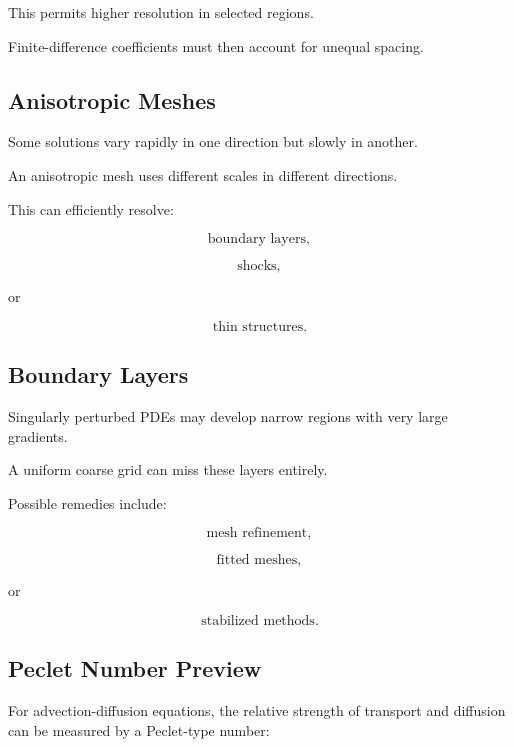 This permits higher resolution in selected regions.

Finite-difference coefficients must then account for unequal spacing.

\subsection{Anisotropic Meshes}
\label{subsec:anisotropic-meshes}

Some solutions vary rapidly in one direction but slowly in another.

An anisotropic mesh uses different scales in different directions.

This can efficiently resolve:

\[
\boxed{
\text{boundary layers},
}
\]

\[
\boxed{
\text{shocks},
}
\]

or

\[
\boxed{
\text{thin structures}.
}
\]

\subsection{Boundary Layers}
\label{subsec:numerical-boundary-layers}

Singularly perturbed PDEs may develop narrow regions with very large
gradients.

A uniform coarse grid can miss these layers entirely.

Possible remedies include:

\[
\boxed{
\text{mesh refinement},
}
\]

\[
\boxed{
\text{fitted meshes},
}
\]

or

\[
\boxed{
\text{stabilized methods}.
}
\]

\subsection{Peclet Number Preview}
\label{subsec:peclet-number}

For advection-diffusion equations, the relative strength of transport and
diffusion can be measured by a Peclet-type number:

